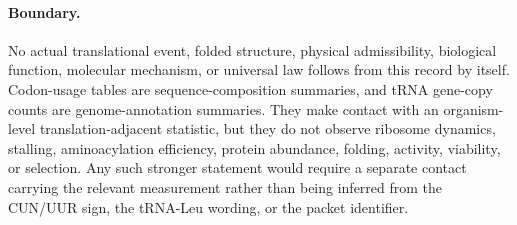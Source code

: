 \paragraph{Boundary.}
No actual translational event, folded structure, physical admissibility, biological function, molecular mechanism, or universal law follows from this record by itself.  Codon-usage tables are sequence-composition summaries, and tRNA gene-copy counts are genome-annotation summaries.  They make contact with an organism-level translation-adjacent statistic, but they do not observe ribosome dynamics, stalling, aminoacylation efficiency, protein abundance, folding, activity, viability, or selection.  Any such stronger statement would require a separate contact carrying the relevant measurement rather than being inferred from the CUN/UUR sign, the tRNA-Leu wording, or the packet identifier.